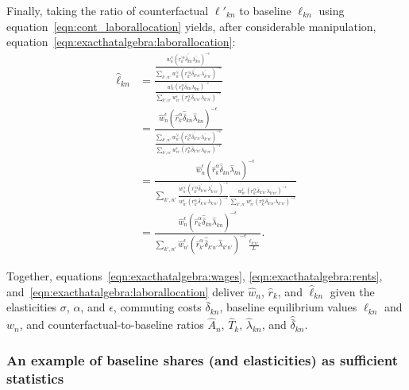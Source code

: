 \documentclass[11pt]{article}
\theoremstyle{definition}
\begin{document}
Finally, taking the ratio of counterfactual $\ell'_{kn}$ to baseline $\ell_{kn}$ using equation~\eqref{eqn:cont_laborallocation} yields, after considerable manipulation, equation~\eqref{eqn:exacthatalgebra:laborallocation}:
\begin{align*}
\hat{\ell}_{kn}
&= \frac{\frac{w_n^{'\epsilon}(r_k^{'\alpha}\bar{\delta}_{kn}^{'}\lambda_{kn}^{'})^{-\epsilon}}{\sum_{k',n'}w_{n'}^{'\epsilon}(r_{k'}^{'\alpha}\bar{\delta}_{k'n'}^{'}\lambda_{k'n'}^{'})^{-\epsilon}}}{\frac{w_n^{\epsilon}(r_k^{\alpha}\bar{\delta}_{kn}\lambda_{kn})^{-\epsilon}}{\sum_{k',n'}w_{n'}^{\epsilon}(r_{k'}^{\alpha}\bar{\delta}_{k'n'}\lambda_{k'n'})^{-\epsilon}}} \\
&= \frac{\hat{w}_{n}^{\epsilon} (\hat{r}_{k}^{\alpha} \hat{\bar{\delta}}_{kn} \hat{\lambda}_{kn} )^{-\epsilon}}{\frac{\sum_{k',n'}w_{n'}^{'\epsilon}(r_{k'}^{'\alpha}\bar{\delta}_{k'n'}^{'}\lambda_{k'n'}^{'})^{-\epsilon}}{\sum_{k',n'}w_{n'}^{\epsilon}(r_{k'}^{\alpha}\bar{\delta}_{k'n'}\lambda_{k'n'})^{-\epsilon}}} \\
&= \frac{\hat{w}_{n}^{\epsilon} (\hat{r}_{k}^{\alpha} \hat{\bar{\delta}}_{kn} \hat{\lambda}_{kn} )^{-\epsilon}}{\sum_{k',n'}\frac{w_{n'}^{'\epsilon}(r_{k'}^{'\alpha}\bar{\delta}_{k'n'}^{'}\lambda_{k'n'}^{'})^{-\epsilon}}{w_{n'}^{\epsilon}(r_{k'}^{\alpha}\bar{\delta}_{k'n'}\lambda_{k'n'})^{-\epsilon}}\frac{w_{n'}^{\epsilon}(r_{k'}^{\alpha}\bar{\delta}_{k'n'}\lambda_{k'n'})^{-\epsilon}}{\sum_{k',n'}w_{n'}^{\epsilon}(r_{k'}^{\alpha}\bar{\delta}_{k'n'}\lambda_{k'n'})^{-\epsilon}}} \\
&= \frac{\hat{w}_{n}^{\epsilon} (\hat{r}_{k}^{\alpha} \hat{\bar{\delta}}_{kn} \hat{\lambda}_{kn} )^{-\epsilon}}{\sum_{k',n'} \hat{w}_{n'}^{\epsilon} (\hat{r}_{k'}^{\alpha} \hat{\bar{\delta}}_{k'n'} \hat{\lambda}_{k'n'} )^{-\epsilon} \frac{\ell_{k'n'}}{L}}.
\end{align*}

Together, equations~\eqref{eqn:exacthatalgebra:wages}, \eqref{eqn:exacthatalgebra:rents}, and~\eqref{eqn:exacthatalgebra:laborallocation}
deliver $\hat{w}_n$, $\hat{r}_k$, and $\hat{\ell}_{kn}$ 
given the elasticities $\sigma$, $\alpha$, and $\epsilon$, commuting costs $\bar{\delta}_{kn}$, baseline equilibrium values $\ell_{kn}$ and $w_{n}$, and
counterfactual-to-baseline ratios $\hat{A}_{n}$, $\hat{T}_{k}$, $\hat{\lambda}_{kn}$, and $\hat{\bar{\delta}}_{kn} $.

\subsubsection{An example of baseline shares (and elasticities) as sufficient statistics\label{appendix:sec:EHA:suffstats}}
\end{document}
